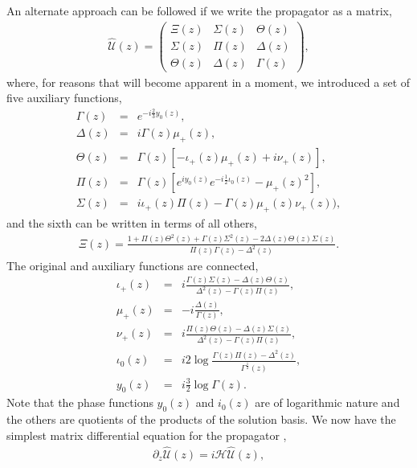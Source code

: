 \documentclass[9pt,twocolumn,twoside]{osajnl}
\begin{document}
An alternate approach can be followed if we write the propagator as a matrix,
\begin{eqnarray}
\hat{\mathcal{U}}(z) = \left( \begin{array}{ccc} 
\Xi(z) & \Sigma(z) & \Theta(z) \\
\Sigma(z) & \Pi(z)    & \Delta(z) \\
\Theta(z) & \Delta(z) & \Gamma(z)
\end{array}  \right),
\end{eqnarray}
where, for reasons that will become apparent in a moment, we introduced a set of five auxiliary functions,
\begin{eqnarray}
	\Gamma(z) &=& e^{- i \frac{2}{3}  y_{0}(z)}, \\
	\Delta(z)&=& i \Gamma(z) \mu_{+}(z), \\
	\Theta(z)&=& \Gamma(z) \left[ -\iota_{+}(z) \mu_{+}(z) + i \nu_{+}(z) \right], \\
	\Pi(z)&=& \Gamma(z) \left[ e^{i y_0 (z)}e^{-i \frac{1}{2}\iota_0 (z)}
		-\mu_{+} (z)^2 \right], \\	
	\Sigma(z)&=& i \iota_{+}(z) \Pi(z) - \Gamma(z) \mu_{+} (z) \nu_{+}(z)), 
\end{eqnarray}
and the sixth can be written in terms of all others,  
\begin{eqnarray}
\Xi(z) = \frac{1 + \Pi(z) \Theta^{2}(z) + \Gamma(z) \Sigma^{2}(z)- 2 \Delta(z) \Theta(z) \Sigma(z)}{ \Pi(z) \Gamma(z) - \Delta^{2}(z)}.
\end{eqnarray}
The original and auxiliary functions are connected,
\begin{eqnarray}
\iota_{+}(z) &=& i \frac{\Gamma(z)\Sigma(z) - \Delta(z)\Theta(z)}{\Delta^2(z)-\Gamma(z)\Pi(z)}, \\
\mu_{+}(z) &=& -i \frac{\Delta(z)}{\Gamma(z)},\\
\nu_{+}(z) &=& i \frac{\Pi(z)\Theta(z) - \Delta(z)\Sigma(z)}{\Delta^2(z)-\Gamma(z)\Pi(z)} ,\\
\iota_{0}(z) &=& i 2 \log \frac{\Gamma(z) \Pi(z) - \Delta^{2}(z)}{\Gamma^{\frac{1}{2}}(z) } , \\
y_{0}(z) &=& i \frac{3}{2} \log \Gamma(z) .
\end{eqnarray}
Note that the phase functions $y_0(z)$ and $i_0(z)$ are of logarithmic nature and the others are quotients of the products of the solution basis. 
We now have the simplest matrix differential equation for the propagator \cite{Reid1939p414,Levin1959p519}, 
\begin{eqnarray}
\partial_{z} \hat{\mathcal{U}}(z) = i \mathcal{H} \hat{\mathcal{U}}(z) ,
\end{eqnarray}
\end{document}
